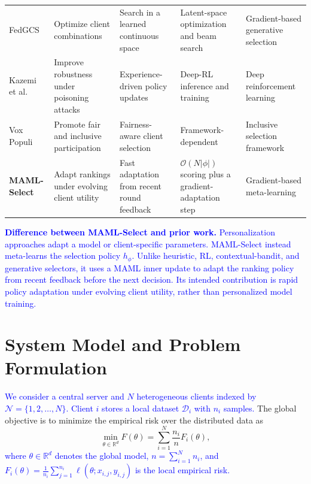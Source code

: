 \documentclass[journal]{IEEEtran}
\newcommand{\revision}[1]{\textcolor{blue}{#1}}
\begin{document}
\begin{table}[!t]
\begin{tabularx}{\textwidth}{lXXXX}
        FedGCS~\cite{ning2024fedgcs} & Optimize client combinations & Search in a learned continuous space & Latent-space optimization and beam search & Gradient-based generative selection \\
        Kazemi et al.~\cite{kazemi2026robust} & Improve robustness under poisoning attacks & Experience-driven policy updates & Deep-RL inference and training & Deep reinforcement learning \\
        Vox Populi~\cite{arisdakessian2026vox} & Promote fair and inclusive participation & Fairness-aware client selection & Framework-dependent & Inclusive selection framework \\
        \textbf{MAML-Select} & Adapt rankings under evolving client utility & Fast adaptation from recent round feedback & $\mathcal{O}(N|\phi|)$ scoring plus a gradient-adaptation step & Gradient-based meta-learning \\
        \bottomrule
    \end{tabularx}
\end{table}

\revision{\textbf{Difference between MAML-Select and prior work.} Personalization approaches adapt a model or client-specific parameters. MAML-Select instead meta-learns the selection policy $h_\phi$. Unlike heuristic, RL, contextual-bandit, and generative selectors, it uses a MAML inner update to adapt the ranking policy from recent feedback before the next decision. Its intended contribution is rapid policy adaptation under evolving client utility, rather than personalized model training.}

\section{System Model and Problem Formulation}
\revision{We consider a central server and $N$ heterogeneous clients indexed by $\mathcal{N} = \{1, 2, \ldots, N\}$. Client $i$ stores a local dataset $\mathcal{D}_i$ with $n_i$ samples.} The global objective is to minimize the empirical risk over the distributed data as
\begin{equation}
	\min_{\theta \in \mathbb{R}^d} F(\theta) = \sum_{i=1}^{N} \frac{n_i}{n} F_i(\theta),
	\label{eq:global_objective}
\end{equation}
\revision{where $\theta \in \mathbb{R}^d$ denotes the global model, $n = \sum_{i=1}^{N} n_i$, and $F_i(\theta) = \frac{1}{n_i} \sum_{j=1}^{n_i} \ell(\theta; x_{i,j}, y_{i,j})$ is the local empirical risk.}
\end{document}
